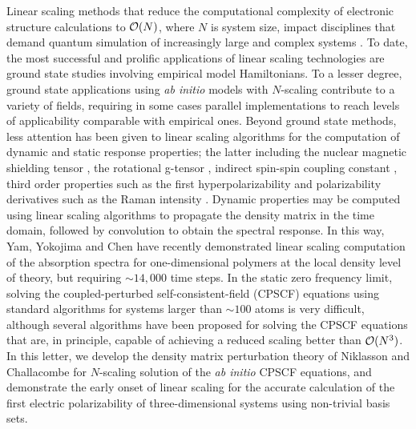 \documentclass[prl,aps,twocolumn,showpacs,twocolumngrid,superbib]{revtex4}
\begin{document}
Linear scaling methods that reduce the computational complexity of 
electronic structure calculations to ${\cal O}(N)$, where $N$ is system size, 
impact disciplines that demand quantum simulation of increasingly large and complex systems
\cite{GGalli96,DBowler97,SGoedecker99,POrdejon00,VGogonea01,SWu02}. 
To date, the most successful and prolific applications of linear scaling technologies are
ground state studies involving empirical model Hamiltonians.  
To a lesser degree, ground state applications using {\em ab initio} models 
with $N$-scaling contribute to a variety of fields, requiring in some
cases parallel implementations to reach levels of applicability comparable with
empirical ones.  Beyond ground state methods, less attention has been given 
to linear scaling algorithms for the computation of dynamic and static response 
properties; the latter including the nuclear magnetic shielding tensor \cite{Pulay_1990}, 
the rotational g-tensor \cite{Helgaker_1996}, indirect spin-spin coupling constant 
\cite{Pennington_1991,Malkin_1996}, third order  properties such as the first hyperpolarizability 
\cite{Franky_1997} and polarizability derivatives such as the Raman intensity 
\cite{Lazzeri_2003,Champagne_2001}.  Dynamic  properties may be computed using 
linear scaling algorithms to propagate the density matrix \cite{SNomura97,CYam03} in 
the time domain, followed by convolution to obtain the spectral response.  In this way, 
Yam, Yokojima and Chen \cite{CYam03} have recently demonstrated linear scaling 
computation of the absorption spectra for one-dimensional polymers at the local 
density level of theory, but requiring $\sim 14,000$ time steps.  
In the static zero frequency limit, solving the coupled-perturbed self-consistent-field 
(CPSCF) equations using standard algorithms for systems larger than $\sim 100$ atoms 
is very difficult, although several algorithms have been proposed for 
solving the CPSCF equations that are, in principle, capable of achieving a reduced scaling 
better than ${\cal O}(N^3)$\cite{COchsenfeld97,HLarsen00,ANiklasson03}.   
In this letter, we develop the density matrix perturbation theory of  Niklasson and Challacombe 
\cite{ANiklasson03} for $N$-scaling solution of the {\em ab initio} CPSCF equations, and 
demonstrate the early onset of linear scaling for the accurate calculation of the first electric 
polarizability of three-dimensional systems using non-trivial basis sets.
\end{document}
